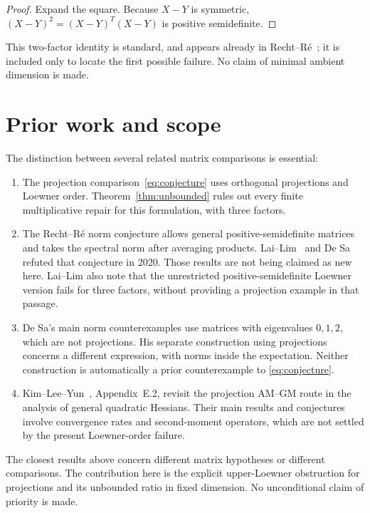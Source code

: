 \documentclass[11pt]{article}
\begin{document}
\begin{proof}
Expand the square. Because $X-Y$ is symmetric, $(X-Y)^2=(X-Y)^T(X-Y)$ is positive semidefinite.
\end{proof}

This two-factor identity is standard, and appears already in Recht--R\'e~\cite{recht}; it is included only to locate the first possible failure. No claim of minimal ambient dimension is made.

\section{Prior work and scope}\label{sec:prior}

The distinction between several related matrix comparisons is essential:
\begin{enumerate}[leftmargin=*]
\item The projection comparison~\eqref{eq:conjecture} uses orthogonal projections and Loewner order. Theorem~\ref{thm:unbounded} rules out every finite multiplicative repair for this formulation, with three factors.
\item The Recht--R\'e norm conjecture allows general positive-semidefinite matrices and takes the spectral norm after averaging products. Lai--Lim~\cite{lai} and De Sa~\cite{desa} refuted that conjecture in 2020. Those results are not being claimed as new here. Lai--Lim also note that the unrestricted positive-semidefinite Loewner version fails for three factors, without providing a projection example in that passage.
\item De Sa's main norm counterexamples use matrices with eigenvalues $0,1,2$, which are not projections. His separate construction using projections concerns a different expression, with norms inside the expectation. Neither construction is automatically a prior counterexample to \eqref{eq:conjecture}.
\item Kim--Lee--Yun~\cite{kim}, Appendix~E.2, revisit the projection AM--GM route in the analysis of general quadratic Hessians. Their main results and conjectures involve convergence rates and second-moment operators, which are not settled by the present Loewner-order failure.
\end{enumerate}

The closest results above concern different matrix hypotheses or different comparisons. The contribution here is the explicit upper-Loewner obstruction for projections and its unbounded ratio in fixed dimension. No unconditional claim of priority is made.
\end{document}
